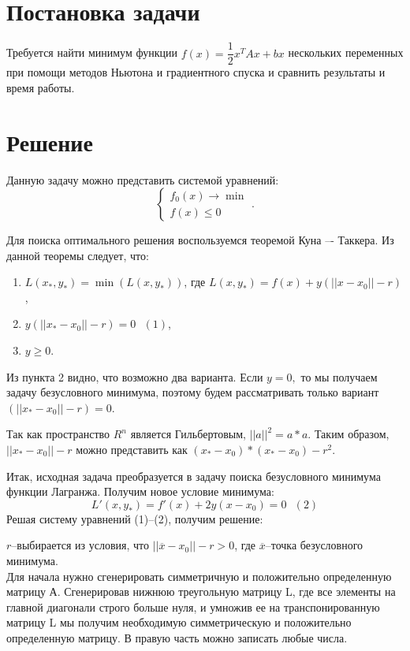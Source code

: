 \documentclass[14pt, titlepage,fleqn]{extarticle}
\begin{document}
	

	
	
	\newpage
	
 
	\clearpage
	\section*{Постановка задачи}
	Требуется найти минимум функции $f(x) = \dfrac{1}{2}x^TAx + bx$ нескольких переменных при помощи методов Ньютона и градиентного спуска и сравнить результаты и время работы.
	\section*{Решение}
	Данную задачу можно представить системой уравнений:
	\[\begin{cases}
		f_0(x) \rightarrow \min\\
		f(x) \leq 0 
	\end{cases}.\]

	Для поиска оптимального решения воспользуемся теоремой Куна –- Таккера. Из данной теоремы следует, что:
	\begin{enumerate}
		\item $L(x_*, y_*) = \min(L(x,y_* ))$, где $L(x,y_* )=f(x)+y(||x-x_0 ||-r)$,
		\item $y(||x_*-x_0 ||-r)=0 ~~~ (1)$,
		\item $y \geq 0$.
	\end{enumerate}


	Из пункта 2 видно, что возможно два варианта. Если $y=0,$  то мы получаем задачу безусловного минимума, поэтому будем рассматривать только вариант $(||x_*-x_0 ||-r)=0.$


	Так как пространство  $R^n$ является Гильбертовым, $||a||^2=a*a.$ Таким образом,$||x_*-x_0 ||-r $ можно представить как $(x_*-x_0 )*(x_*-x_0 )-r^2.$


	Итак, исходная задача преобразуется в задачу поиска безусловного минимума функции Лагранжа. Получим новое условие минимума:
	\[L' (x,y_* )=f' (x)+2y(x-x_0 )=0~~~ (2)\]
	\newpage
	Решая систему уравнений (1)--(2), получим решение:


	$r$--выбирается из условия, что $||\overline{x} - x_0|| - r > 0$, где $\overline{x}$--точка безусловного минимума.\\


 	Для начала нужно сгенерировать симметричную и положительно определенную матрицу А. Сгенерировав нижнюю треугольную матрицу L, где все элементы на главной диагонали строго больше нуля, и умножив ее на транспонированную матрицу L мы получим необходимую симметрическую и положительно определенную матрицу. В правую часть можно записать любые числа.
\end{document}
